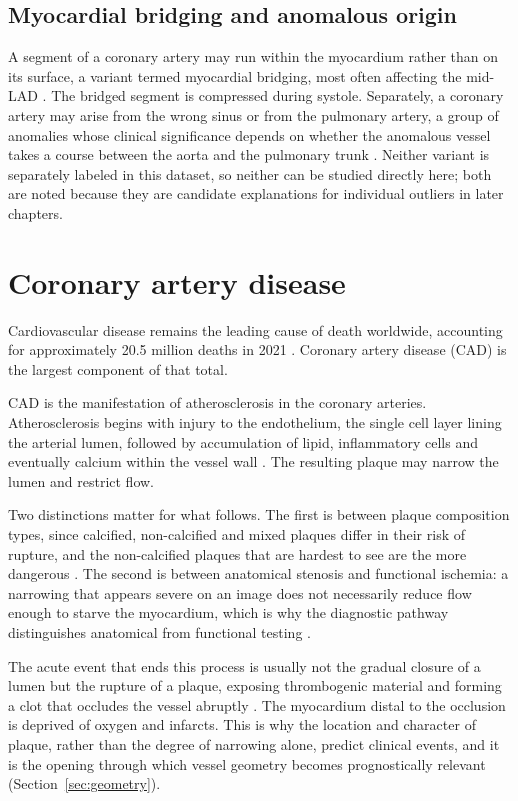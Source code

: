 \subsection{Myocardial bridging and anomalous origin}

A segment of a coronary artery may run within the myocardium rather than on its surface, a
variant termed myocardial bridging, most often affecting the mid-LAD
\cite{obrien2007anatomy}.
The bridged segment is compressed during systole.
Separately, a coronary artery may arise from the wrong sinus or from the pulmonary artery, a
group of anomalies whose clinical significance depends on whether the anomalous vessel takes
a course between the aorta and the pulmonary trunk \cite{obrien2007anatomy}.
Neither variant is separately labeled in this dataset, so neither can be studied directly
here; both are noted because they are candidate explanations for individual outliers in later
chapters.

\section{Coronary artery disease}
\label{sec:cad}

Cardiovascular disease remains the leading cause of death worldwide, accounting for
approximately 20.5 million deaths in 2021 \cite{lindstrom2022global}.
Coronary artery disease (CAD) is the largest component of that total.

CAD is the manifestation of atherosclerosis in the coronary arteries.
Atherosclerosis begins with injury to the endothelium, the single cell layer lining the
arterial lumen, followed by accumulation of lipid, inflammatory cells and eventually calcium
within the vessel wall \cite{geometry2022plaqueburden}.
The resulting plaque may narrow the lumen and restrict flow.

Two distinctions matter for what follows.
The first is between plaque composition types, since calcified, non-calcified and mixed
plaques differ in their risk of rupture, and the non-calcified plaques that are hardest to
see are the more dangerous \cite{geometry2022plaqueburden}.
The second is between anatomical stenosis and functional ischemia: a narrowing that appears
severe on an image does not necessarily reduce flow enough to starve the myocardium, which is
why the diagnostic pathway distinguishes anatomical from functional testing
\cite{knuuti2019esc}.

The acute event that ends this process is usually not the gradual closure of a lumen but the
rupture of a plaque, exposing thrombogenic material and forming a clot that occludes the
vessel abruptly \cite{geometry2022plaqueburden}.
The myocardium distal to the occlusion is deprived of oxygen and infarcts.
This is why the location and character of plaque, rather than the degree of narrowing alone,
predict clinical events, and it is the opening through which vessel geometry becomes
prognostically relevant (Section~\ref{sec:geometry}).

